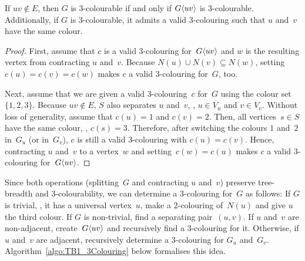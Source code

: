 \begin{lemma}
    \label{lem:GcolorableIffGprimeColourable}
If \( uv \notin E \), then \( G \) is 3-colourable if and only if \( G \langle uv \rangle \) is 3-colourable.
Additionally, if \( G \) is 3-colourable, it admits a valid 3-colouring such that \( u \) and~\( v \) have the same colour.
\end{lemma}

\begin{proof}
First, assume that $c$ is a valid 3-colouring for~$G \langle uv \rangle$ and $w$ is the resulting vertex from contracting $u$ and~$v$.
Because $N(u) \cup N(v) \subseteq N(w)$, setting $c(u) = c(v) = c(w)$ makes $c$ a valid 3-colouring for~$G$, too.

Next, assume that we are given a valid 3-colouring~$c$ for~$G$ using the colour set $\{ 1, 2, 3 \}$.
Because $uv \notin E$, $S$ also separates $u$ and~$v$, \ie, $u \in V_u$ and $v \in V_v$.
Without loss of generality, assume that $c(u) = 1$ and $c(v) = 2$.
Then, all vertices~$s \in S$ have the same colour, \ie, $c(s) = 3$.
Therefore, after switching the colours $1$ and~$2$ in~$G_u$ (or in~$G_v$), $c$ is still a valid 3-colouring with $c(u) = c(v)$.
Hence, contracting $u$ and~$v$ to a vertex~$w$ and setting~$c(w) = c(u)$ makes $c$ a valid 3-colouring for~$G \langle uv \rangle$.
\end{proof}

Since both operations (splitting~$G$ and contracting $u$ and~$v$) preserve tree-breadth and 3-colourability, we can determine a 3-colouring for~$G$ as follows:
If $G$ is trivial, \ie, it has a universal vertex~$u$, make a 2-colouring of~$N(u)$ and give $u$ the third colour.
If $G$ is non-trivial, find a separating pair~$(u, v)$.
If $u$ and~$v$ are non-adjacent, create~$G \langle uv \rangle$ and recursively find a 3-colouring for it.
Otherwise, if $u$ and~$v$ are adjacent, recursively determine a 3-colouring for $G_u$ and~$G_v$.
Algorithm~\ref{algo:TB1_3Colouring} below formalises this idea.

